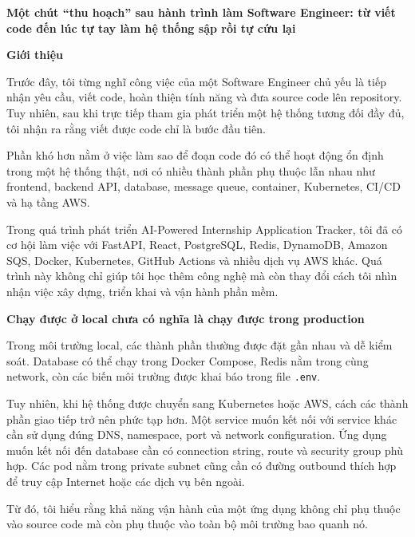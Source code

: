 \vspace{0.5em}\noindent\textbf{Một chút ``thu hoạch'' sau hành trình làm Software Engineer: từ
viết code đến lúc tự tay làm hệ thống sập rồi tự cứu
lại}\par

\vspace{0.5em}\noindent\textbf{Giới thiệu}\par

Trước đây, tôi từng nghĩ công việc của một Software Engineer chủ yếu là
tiếp nhận yêu cầu, viết code, hoàn thiện tính năng và đưa source code
lên repository. Tuy nhiên, sau khi trực tiếp tham gia phát triển một hệ
thống tương đối đầy đủ, tôi nhận ra rằng viết được code chỉ là bước đầu
tiên.

Phần khó hơn nằm ở việc làm sao để đoạn code đó có thể hoạt động ổn định
trong một hệ thống thật, nơi có nhiều thành phần phụ thuộc lẫn nhau như
frontend, backend API, database, message queue, container, Kubernetes,
CI/CD và hạ tầng AWS.

Trong quá trình phát triển AI-Powered Internship Application Tracker,
tôi đã có cơ hội làm việc với FastAPI, React, PostgreSQL, Redis,
DynamoDB, Amazon SQS, Docker, Kubernetes, GitHub Actions và nhiều dịch
vụ AWS khác. Quá trình này không chỉ giúp tôi học thêm công nghệ mà còn
thay đổi cách tôi nhìn nhận việc xây dựng, triển khai và vận hành phần
mềm.

\vspace{0.5em}\noindent\textbf{Chạy được ở local chưa có nghĩa là chạy được trong
production}\par

Trong môi trường local, các thành phần thường được đặt gần nhau và dễ
kiểm soát. Database có thể chạy trong Docker Compose, Redis nằm trong
cùng network, còn các biến môi trường được khai báo trong file
\texttt{.\allowbreak{}env}.

Tuy nhiên, khi hệ thống được chuyển sang Kubernetes hoặc AWS, cách các
thành phần giao tiếp trở nên phức tạp hơn. Một service muốn kết nối với
service khác cần sử dụng đúng DNS, namespace, port và network
configuration. Ứng dụng muốn kết nối đến database cần có connection
string, route và security group phù hợp. Các pod nằm trong private
subnet cũng cần có đường outbound thích hợp để truy cập Internet hoặc
các dịch vụ bên ngoài.

Từ đó, tôi hiểu rằng khả năng vận hành của một ứng dụng không chỉ phụ
thuộc vào source code mà còn phụ thuộc vào toàn bộ môi trường bao quanh
nó.

